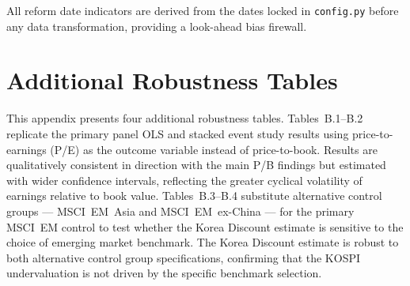 \documentclass[12pt]{article}
\begin{document}
\begin{appendices}
All reform date indicators are derived from the dates locked in \texttt{config.py} before
any data transformation, providing a look-ahead bias firewall.

\section{Additional Robustness Tables}
\label{app:robustness}

This appendix presents four additional robustness tables. Tables~B.1--B.2 replicate the
primary panel OLS and stacked event study results using price-to-earnings (P/E) as the
outcome variable instead of price-to-book. Results are qualitatively consistent in direction
with the main P/B findings but estimated with wider confidence intervals, reflecting the
greater cyclical volatility of earnings relative to book value. Tables~B.3--B.4 substitute
alternative control groups --- MSCI~EM~Asia and MSCI~EM~ex-China --- for the primary MSCI~EM
control to test whether the Korea Discount estimate is sensitive to the choice of emerging
market benchmark. The Korea Discount estimate is robust to both alternative control group
specifications, confirming that the KOSPI undervaluation is not driven by the specific
benchmark selection.






\end{appendices}
\end{document}
